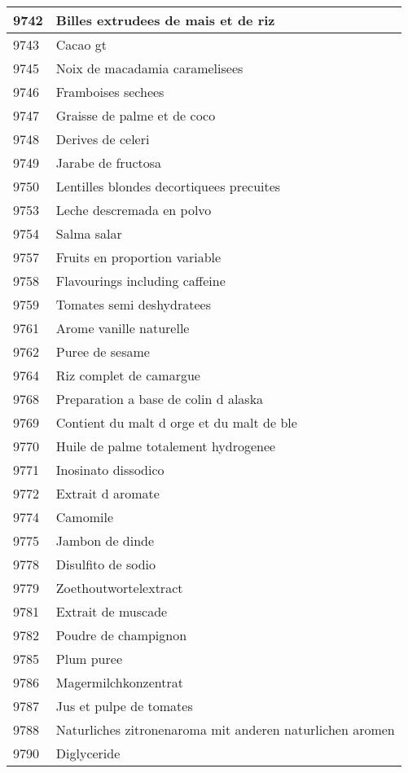 \begin{longtable}{|l|l|}
9742 & Billes extrudees de mais et de riz \\ \hline 
9743 & Cacao gt \\ \hline 
9745 & Noix de macadamia caramelisees \\ \hline 
9746 & Framboises sechees \\ \hline 
9747 & Graisse de palme et de coco \\ \hline 
9748 & Derives de celeri \\ \hline 
9749 & Jarabe de fructosa \\ \hline 
9750 & Lentilles blondes decortiquees precuites \\ \hline 
9753 & Leche descremada en polvo \\ \hline 
9754 & Salma salar \\ \hline 
9757 & Fruits en proportion variable \\ \hline 
9758 & Flavourings including caffeine \\ \hline 
9759 & Tomates semi deshydratees \\ \hline 
9761 & Arome vanille naturelle \\ \hline 
9762 & Puree de sesame \\ \hline 
9764 & Riz complet de camargue \\ \hline 
9768 & Preparation a base de colin d alaska \\ \hline 
9769 & Contient du malt d orge et du malt de ble \\ \hline 
9770 & Huile de palme totalement hydrogenee \\ \hline 
9771 & Inosinato dissodico \\ \hline 
9772 & Extrait d aromate \\ \hline 
9774 & Camomile \\ \hline 
9775 & Jambon de dinde \\ \hline 
9778 & Disulfito de sodio \\ \hline 
9779 & Zoethoutwortelextract \\ \hline 
9781 & Extrait de muscade \\ \hline 
9782 & Poudre de champignon \\ \hline 
9785 & Plum puree \\ \hline 
9786 & Magermilchkonzentrat \\ \hline 
9787 & Jus et pulpe de tomates \\ \hline 
9788 & Naturliches zitronenaroma mit anderen naturlichen aromen \\ \hline 
9790 & Diglyceride \\ \hline 

\end{longtable}
